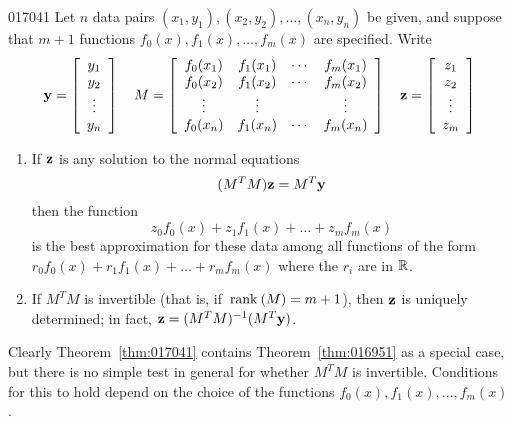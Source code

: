 \begin{theorem}{}{017041} %
Let $n$ data pairs $(x_{1}, y_{1}), (x_{2}, y_{2}), \dots, (x_{n}, y_{n})$ be given, and suppose that $m + 1$ functions $f_{0}(x), f_{1}(x), \dots, f_{m}(x)$ are specified. Write
\begin{equation*}
\textbf{y} = \left[ \begin{array}{c}
y_1 \\
y_2 \\
\vdots \\
y_n
\end{array} \right]
\quad M = \left[ \begin{array}{cccc}
	f_0(x_1) & f_1(x_1) & \cdots & f_m(x_1) \\
	f_0(x_2) & f_1(x_2) & \cdots & f_m(x_2) \\
	\vdots & \vdots & & \vdots \\
	f_0(x_n) & f_1(x_n) & \cdots & f_m(x_n) \\
\end{array} \right]
\quad
\textbf{z} = \left[ \begin{array}{c}
z_1 \\
z_2 \\
\vdots \\
z_m
\end{array} \right]
\end{equation*}
\begin{enumerate}
\item If $\textbf{z}$ is any solution to the normal equations
\begin{equation*}
(M^TM)\textbf{z} = M^T\textbf{y}
\end{equation*}
then the function
\begin{equation*}
z_0f_0(x) + z_1f_1(x) + \dots + z_mf_m(x)
\end{equation*}
is the best approximation for these data among all functions of the form $r_{0}f_{0}(x) + r_{1}f_{1}(x) + \dots + r_{m}f_{m}(x)$ where the $r_{i}$ are in $\mathbb{R}$.

\item If $M^{T}M$ is invertible (that is, if $\thinspace\operatorname{rank\medspace}(M) = m + 1$), then $\textbf{z}$ is uniquely determined; in fact, $\textbf{z} = (M^{T}M)^{-1}(M^{T}\textbf{y})$.

\end{enumerate}
\end{theorem}

\noindent Clearly Theorem~\ref{thm:017041} contains Theorem~\ref{thm:016951} as a special case, but there is no simple test in general for whether $M^{T}M$ is invertible. Conditions for this to hold depend on the choice of the functions $f_{0}(x), f_{1}(x), \dots, f_{m}(x)$.

